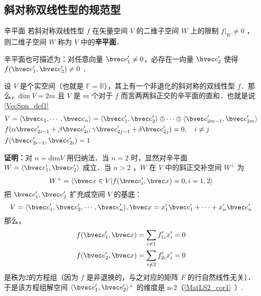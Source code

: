  \subsection{斜对称双线性型的规范型}
 \begin{definition}{辛平面}
 若斜对称双线性型 $f$ 在矢量空间 $V$ 的二维子空间 $W$ 上的限制 $f|_W\neq0$ ，则二维子空间 $W$ 称为 $V$ 中的\textbf{辛平面}．
 \end{definition}
 辛平面也可描述为：对任意向量 $\bvec e'_1\neq0$，必存在一向量 $\bvec e'_2$ 使得 $f(\bvec e'_1,\bvec e'_2)\neq0$ ．
 \begin{theorem}{}
 设 $V$ 是个实空间（也就是 $\mathbb{F}=\mathbb{R}$），其上有一个非退化的斜对称的双线性型 $f$．那么，$\mathrm{dim}\;V=2m$ 且 $V$ 是 $m$ 个对于 $f$ 而言两两斜正交的辛平面的直和．也就是说\autoref{VecSpn_def1}~
 \begin{equation}
 \begin{aligned}
 &V=\langle\bvec e_1,\cdots,\bvec e_n\rangle=\langle\bvec e'_1,\bvec e'_2\rangle\oplus\cdots\oplus\langle\bvec e'_{2m-1},\bvec e'_{2m}\rangle\\
&f(\alpha\bvec e'_{2i-1}+\beta\bvec e'_{2i},\gamma\bvec e'_{2j-1}+\delta\bvec e'_{2j})=0,\quad i\neq j\\
 &f(\bvec e'_{2i-1},\bvec e'_{2i})=1
 \end{aligned}
 \end{equation}

 \end{theorem}
\textbf{证明：}对 $n=\mathrm{dim} V$ 用归纳法．当 $n=2$ 时，显然对辛平面 $W=\langle \bvec e'_1,\bvec e'_2\rangle$ 成立．当 $n>2$ ，$W$ 在 $V$ 中的斜正交补空间 $W^{\perp}$ 为
\begin{equation}
W^{\perp}=\langle\bvec x\in V|f(\bvec e'_i,\bvec x)=0,i=1,2\rangle
\end{equation}
把 $\bvec e'_1,\bvec e'_2$ 扩充成空间 $V$ 的基底：
\begin{equation}
V=\langle \bvec e'_1,\bvec e'_2,\cdots,\bvec e'_n\rangle, \bvec x=x'_1\bvec e'_1+\cdots+x'_n\bvec e'_n
\end{equation}
那么，
\begin{equation}
\begin{aligned}
&f(\bvec e'_1,\bvec x)=\sum_{i\neq 1}f'_{1i}x'_i=0\\
&f(\bvec e'_2,\bvec x)=\sum_{i\neq 2}f'_{2i}x'_i=0
\end{aligned}
\end{equation}
是秩为2的方程组（因为 $f$ 是非退换的，与之对应的矩阵 $F$ 的行自然线性无关）．于是该方程组解空间 $\langle\bvec e'_1,\bvec e'_2\rangle^{\perp}$ 的维度是 n-2（\autoref{MatLS2_cor1}~）.
